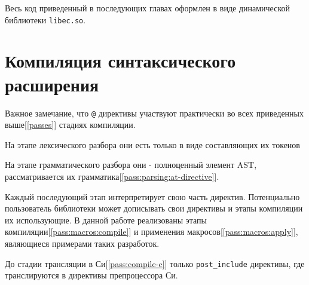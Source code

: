 Весь код приведенный в последующих главах оформлен в виде динамической библиотеки \verb|libec.so|.

\section{Компиляция синтаксического расширения}
Важное замечание, что \verb|@| директивы участвуют практически во всех приведенных выше[\ref{passes}] стадиях компиляции.

На этапе лексического разбора они есть только в виде составляющих их токенов 

На этапе грамматического разбора они - полноценный элемент AST, рассматривается их грамматика[\ref{pass:parsing:at-directive}].

Каждый последующий этап интерпретирует свою часть директив. Потенциально пользователь библиотеки может дописывать свои директивы и этапы компиляции их использующие.
В данной работе реализованы этапы компиляции[\ref{pass:macros:compile}] и применения макросов[\ref{pass:macros:apply}], являющиеся примерами таких разработок.

До стадии трансляции в Си[\ref{pass:compile-c}]  только \verb|post_include| директивы, где транслируются в директивы препроцессора Си.



















